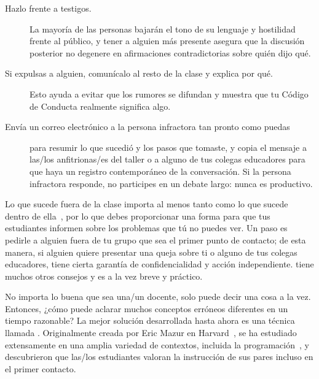 \begin{description}

\item[Hazlo frente a testigos.]
  La mayoría de las personas bajarán el tono de su lenguaje y hostilidad frente al público,
  y tener a alguien más presente asegura que
  la discusión posterior no degenere en afirmaciones contradictorias sobre quién dijo qué.

\item[Si expulsas a alguien, comunícalo al resto de la clase y explica por qué.]
  Esto ayuda a evitar que los rumores se difundan
  y muestra que tu Código de Conducta realmente significa algo.

\item[Envía un correo electrónico a la persona infractora tan pronto como puedas]
  para resumir lo que sucedió y los pasos que tomaste,
  y copia el mensaje a las/los anfitrionas/es del taller o a alguno de tus colegas educadores
  para que haya un registro contemporáneo de la conversación.
  Si la persona infractora responde,
  no participes en un debate largo:
  nunca es productivo.
 
\end{description}

Lo que sucede fuera de la clase importa al menos tanto como lo que sucede dentro de ella~\cite{Part2011},
por lo que debes proporcionar una forma para que tus estudiantes informen sobre los problemas que tú no puedes ver.
Un paso es pedirle a alguien fuera de tu grupo que sea el primer punto de contacto;
de esta manera,
si alguien quiere presentar una queja sobre ti o alguno de tus colegas educadores,
tiene cierta garantía de confidencialidad y acción independiente.
\cite{Auro2019} tiene muchos otros consejos
y es a la vez breve y práctico.


No importa lo buena que sea una/un docente,
solo puede decir una cosa a la vez.
Entonces, ¿cómo puede aclarar muchos conceptos erróneos diferentes en un tiempo razonable?
La mejor solución desarrollada hasta ahora es una técnica llamada .
Originalmente creada por Eric Mazur en Harvard~\cite{Mazu1996},
se ha estudiado extensamente en una amplia variedad de contextos,
incluida la programación~\cite{Crou2001,Port2013},
y~\cite{Port2016} descubrieron que las/los estudiantes valoran la instrucción de sus pares incluso en el primer contacto.

